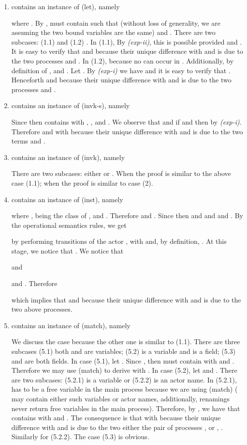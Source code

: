 \documentclass{LMCS}
\theoremstyle{plain}\newtheorem{proposition}[thm]{Proposition}
\theoremstyle{plain}\newtheorem{lemma}[thm]{Lemma}
\theoremstyle{plain}\newtheorem{theorem}[thm]{Theorem}
\theoremstyle{plain}\newtheorem{corollary}[thm]{Corollary}
\newcommand{\rulename}[1]{{\sc(#1)}}
\begin{document}
\begin{enumerate}
\item
 contains an instance of \rulename{let}, namely
 
where . 
By  ,
 must contain  such that  (without loss of 
generality, we are assuming the two bound variables are the same) and .
There are two subcases: (1.1)
 and (1.2) . In (1.1), By \emph{(exp-ii)}, 
this is possible provided  and . It is easy to verify that
 and 
because their unique difference with  and 
is due to the two processes  and .
In (1.2),  because no  can occur in .
Additionally, by definition of ,  and .
Let . By \emph{(exp-i)} we have  and it is easy to verify that .
Henceforth  and 
because their unique difference with  and 
is due to the two processes  and .

\item
 contains an instance of \rulename{invk-s}, namely

Since  then  contains  with
, , and . 
We observe that  and if  and  then
 by \emph{(exp-i)}. Therefore   and  with  because their unique difference with  and 
is due to the two terms 
 and 
.

\item
 contains an instance of \rulename{invk},
namely 
 
There are two subcases: either  or . When 
the proof is similar to the above case (1.1); when  the proof is 
similar to case (2).

\item
 contains an instance of \rulename{inst}, namely

where ,  being the class of ,
 and .
Therefore  and . 
Since  then  and 
 and  and . By the operational semantics rules, we get
 
by performing transitions of the actor , with  
and, by definition, . At this stage, we notice that . We notice that

and

and
.
Therefore 

which implies that  and 
because their unique difference with  and 
is due to the two above processes.

\item
 contains an instance of \rulename{match}, namely

We discuss the case  because the other one is similar to (1.1).
There are three subcases (5.1) both  and  are variables;
(5.2)  is a variable and  is a field; (5.3)  and  are
both fields. In case (5.1), let . Since , then  must contain  with  and . Therefore we may use \rulename{match} to derive
 with .
In case (5.2), let  and .
There are two subcases: (5.2.1)  is a variable or (5.2.2)  is an actor name.
In (5.2.1),  has to be a free variable in the main process because we are
using \rulename{match} ( may contain either such variables or actor names, additionally, renamings never return free variables in the main process). Therefore, by 
, we have that  contains  with  and . The consequence is that
 with  
because their unique difference with  and 
is due to the two either the pair of processes , 
or , .
Similarly for (5.2.2). 
The case (5.3) is obvious. 


\end{enumerate}
\end{document}
